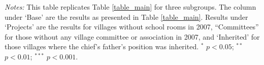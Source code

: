  \begin{flushleft}\textit{Notes:} This table replicates Table \ref{table_main} for three subgroups. The column under `Base' are the results as presented in Table \ref{table_main}. 
  Results under `Projects' are the results for villages without school rooms in 2007, 
  ``Committees'' for those without any village committee or association in 2007, and `Inherited' for those villages where the chief's father's position 
  was inherited. $^*$ $p<0.05$; $^{**}$ $p<0.01$; $^{***}$ $p<0.001$. \end{flushleft}  
